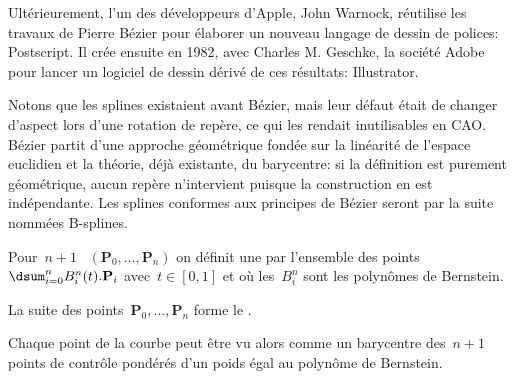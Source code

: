 \begin{histoire}
Ultérieurement, l'un des développeurs d'Apple, John Warnock, 
réutilise les travaux de Pierre Bézier pour élaborer un nouveau langage de dessin de polices: Postscript.
Il crée ensuite en 1982, avec Charles M. Geschke, 
la société Adobe pour lancer un logiciel de dessin dérivé de ces résultats: Illustrator.

\medskip
Notons que les splines existaient avant Bézier,
mais leur défaut était de changer d'aspect lors d'une rotation de repère, ce qui les rendait inutilisables 
en CAO. 
Bézier partit d'une approche géométrique fondée sur la linéarité de l'espace euclidien et la 
théorie, déjà existante, du barycentre: si la définition est purement géométrique, aucun 
repère n'intervient puisque la construction en est indépendante.
Les splines conformes aux principes de Bézier seront par la suite nommées B-splines.
\end{histoire}

\medskip
Pour~$n+1$ ~$(\mathbf{P}_0, \dots, \mathbf{P}_n)$ on définit 
une  par l'ensemble des points~$\dsum_{i = 0}^n B_i^n(t) . \mathbf{P}_i$ 
avec~$t \in[0, 1]$ et où les~$B_i^n$ sont les polynômes de Bernstein.

La suite des points~$\mathbf{P}_0, \dots, \mathbf{P}_n$ forme le .

\medskip
Chaque point de la courbe peut être vu alors comme un barycentre des~$n+1$ points de contrôle
pondérés d'un poids égal au polynôme de Bernstein. 

